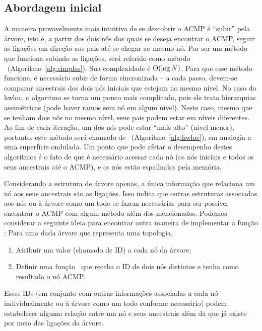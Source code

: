 \subsection{Abordagem inicial}

A maneira provavelmente mais intuitiva de se descobrir o ACMP é ``subir'' pela árvore, isto é, a partir dos dois nós dos quais se deseja encontrar o ACMP,
seguir as ligações em direção aos pais até se chegar ao mesmo nó.
Por ser um método que funciona subindo as ligações, será referido como método \Simples\ (Algoritmo~\ref{alg:simples}).
Sua complexidade é $\operatorname{O}(\log N)$.
Para que esse método funcione, é necessário subir de forma sincronizada -- a cada passo, devem-se comparar ancestrais dos dois nós iniciais que estejam no mesmo nível.
No caso do hwloc, o algoritmo se torna um pouco mais complicado, pois ele trata hierarquias assimétricas (pode haver ramos sem nó em algum nível).
Neste caso, mesmo que se tenham dois nós no mesmo nível, seus pais podem estar em níveis diferentes.
Ao fim de cada iteração, um dos nós pode estar ``mais alto'' (nível menor), portanto, este método será chamado de \Hwloc\ (Algoritmo~\ref{alg:hwloc}), em analogia a uma superfície ondulada.
Um ponto que pode afetar o desempenho destes algoritmos é o fato de que é necessário acessar cada nó
(os nós iniciais e todos os seus ancestrais até o ACMP), e os nós estão espalhados pela memória.





Considerando a estrutura de árvore apenas, a única informação que relaciona um nó aos seus ancestrais são as ligações.
Isso indica que outras estruturas associadas aos nós ou à árvore como um todo se fazem necessárias
para ser possível encontrar o ACMP com algum método além dos mencionados.
Podemos considerar a seguinte ideia para encontrar outra maneira de implementar a função \fACMP:
Para uma dada árvore que representa uma topologia,
\begin{enumerate}
	\item Atribuir um valor (chamado de ID) a cada nó da árvore;
	\item Definir uma função \ACMPIDs\ que receba o ID de dois nós distintos e tenha como resultado o nó ACMP.
\end{enumerate}
Esses IDs (em conjunto com outras informações associadas a cada nó individualmente ou à árvore como um todo conforme necessário)
podem estabelecer alguma relação entre um nó e seus ancestrais além da que já existe por meio das ligações da árvore.

